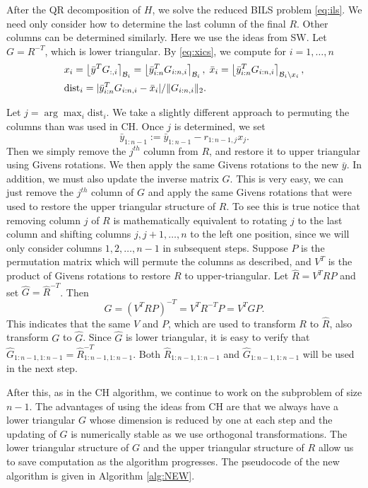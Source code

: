 \documentclass[12pt,Bold,letterpaper]{mcgilletdclass}
\newcommand{\dist}{\mathrm{dist}}
\begin{document}
After the QR decomposition of $H$, we  solve the reduced BILS problem \eqref{eq:ils}.
We need only consider how to determine the last column of the final $R$.
Other columns can be determined similarly. 
Here we use the ideas from SW.
Let $G=R^{-T}$, which is lower triangular.
By \eqref{eq:xics}, we compute for $i=1,\ldots, n$
\begin{align*}
& x_i = \left \lfloor \bar{y}^TG_{:,i} \right \rceil_{{\cal B}_i} 
=\left \lfloor \bar{y}_{i:n}^T G_{i:n,i} \right \rceil_{{\cal B}_i}, \;
\bar{x}_i=\left \lfloor \bar{y}_{i:n}^T G_{i:n,i} \right \rceil_{{\cal B}_i\backslash x_i}, \\
& \dist_i = |\bar{y}_{i:n}^T G_{i:n,i}-\bar{x}_i|/\|G_{i:n,i}\|_2.
\end{align*}

Let $j=\arg\max_{i} \dist_i$. We  take a slightly different approach to
permuting the columns than was used in CH. Once $j$ is determined, we  
set $$\bar{y}_{1:n-1} := \bar{y}_{1:n-1} - r_{1:n-1,j}x_j.$$ Then we simply remove
the $j^{th}$ column from $R$, and restore it to upper triangular using
Givens rotations. We then apply the same Givens rotations to the new
$\bar{y}$. In addition, we must also update the inverse matrix $G$. This is
very easy, we can just remove the $j^{th}$ column of $G$ and apply the same
Givens rotations that were used to restore the upper triangular structure of
$R$. To see this is true notice that removing column $j$ of $R$ is
mathematically equivalent to rotating $j$ to the last column and shifting
columns $j, j+1, \ldots, n$ to the left one position, since we will only consider columns
$1, 2, \ldots, n-1$ in subsequent steps. Suppose $P$ is the permutation matrix which
will permute the columns as described, and $V^T$ is the product of Givens
rotations to restore $R$ to upper-triangular. Let $\hat{R} = V^TRP$ and set
$\hat{G} = \hat{R}^{-T}$. Then
$$
\hat{G} = (V^TRP)^{-T} = V^TR^{-T}P = V^TGP.
$$
This indicates that  the same $V$ and $P$, which are used to transform $R$ to  $\hat{R}$, 
also transform $G$ to $\hat{G}$.
Since $\hat{G}$ is lower triangular, it is easy to verify that
$\hat{G}_{1:n-1,1:n-1} = \hat{R}^{-T}_{1:n-1,1:n-1}$.
Both $\hat{R}_{1:n-1,1:n-1}$ and $\hat{G}_{1:n-1,1:n-1}$ will be used in the next step.

After this, as in the CH algorithm, we continue to work on the subproblem of size $n-1$. 
The advantages of using the ideas from CH are that we always have a lower triangular $G$
whose dimension is reduced by one at each step
and the updating of $G$ is numerically stable as we use orthogonal transformations. The lower triangular structure of $G$ and the upper triangular structure of $R$ allow us to save computation as the algorithm progresses.
The pseudocode of the new algorithm is given in Algorithm  \ref{alg:NEW}.
\end{document}

